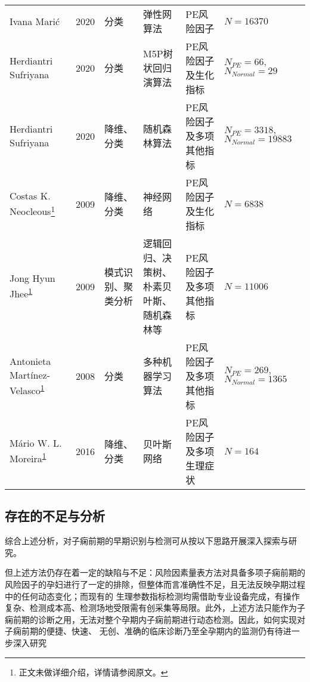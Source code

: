 \begin{center}
\begin{longtable}{p{3cm}<{\centering}p{0.8cm}<{\centering}p{1.8cm}<{\centering}p{3.5cm}<{\centering}p{3cm}<{\centering}p{2cm}<{\centering}}
            Ivana Mari{\'{c}}\cite{Maric2020}&2020&分类&弹性网算法&PE风险因子&$N=16370$\\
            Herdiantri Sufriyana\cite{Sufriyana2020-1}&2020&分类&M5P树状回归演算法&PE风险因子及生化指标&\tabincell{c}{$N_{PE}=66,$\\$N_{Normal}=29$}\\
            Herdiantri Sufriyana\cite{Sufriyana2020}&2020&降维、分类&随机森林算法&PE风险因子及多项其他指标&\tabincell{c}{$N_{PE}=3318,$\\$N_{Normal}=19883$}\\
            Costas K. Neocleous\cite{Neocleous2009}\footnote{正文未做详细介绍，详情请参阅原文。\label{ft:note}}&2009&降维、分类&神经网络&PE风险因子及生化指标&$N=6838$\\
            Jong Hyun Jhee\cite{Jhee2019}\textsuperscript{\ref{ft:note}}&2009&模式识别、聚类分析&\tabincell{c}{逻辑回归、决策树、\\朴素贝叶斯、随机森林等}&PE风险因子及多项其他指标&$N=11006$\\
            Antonieta Martínez-Velasco\cite{Martinez2018}\textsuperscript{\ref{ft:note}}&2008&分类&多种机器学习算法&PE风险因子及多项其他指标&\tabincell{c}{$N_{PE}=269,$\\$N_{Normal}=1365$}\\
            Mário W. L. Moreira\cite{Moreira2016}\textsuperscript{\ref{ft:note}}&2016&降维、分类&贝叶斯网络&PE风险因子及多项生理症状&$N=164$\\
	\end{longtable}
\end{center}

\subsection{存在的不足与分析}
综合上述分析，对子痫前期的早期识别与检测可从按以下思路开展深入探索与研究。

但上述方法仍存在着一定的缺陷与不足：风险因素量表方法对具备多项子痫前期的风险因子的孕妇进行了一定的排除，但整体而言准确性不足，且无法反映孕期过程中的任何动态变化；而现有的
生理参数指标检测均需借助专业设备完成，有操作复杂、检测成本高、检测场地受限需有创采集等局限。此外，上述方法只能作为子痫前期的诊断之用，无法对整个孕期内子痫前期进行动态检测。因此，如何实现对子痫前期的便捷、快速、
无创、准确的临床诊断乃至全孕期内的监测仍有待进一步深入研究



